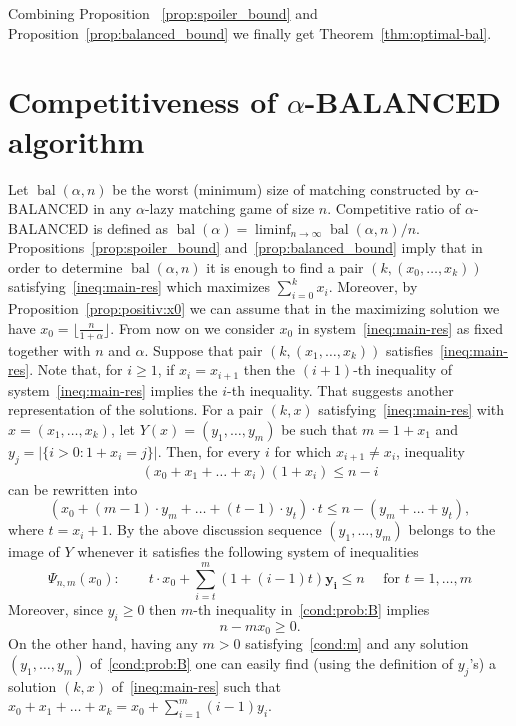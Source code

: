 \documentclass[12pt]{amsart}
\renewcommand{\leq}{\leqslant}
\renewcommand{\geq}{\geqslant}
\theoremstyle{definition}
\newcommand{\Alg}[0]{\textsf{BALANCED}\xspace}
\DeclareMathOperator{\bal}{bal}
\newcommand{\eqB}{\Psi}
\newcommand{\vr}[1]{\mathbf{#1}}
\begin{document}
Combining Proposition ~\ref{prop:spoiler_bound} and Proposition~\ref{prop:balanced_bound} we finally get Theorem~\ref{thm:optimal-bal}.

\section{Competitiveness of $\alpha$-\Alg{} algorithm}
\label{sect:comp}


Let $\bal(\alpha,n)$ be the worst (minimum) size of matching constructed by $\alpha$-\Alg{} in any $\alpha$-lazy matching game of size $n$.
Competitive ratio of $\alpha$-\Alg{} is defined as $\bal(\alpha) = \liminf_{n\to\infty} \bal(\alpha,n)/n$.
Propositions~\ref{prop:spoiler_bound} and~\ref{prop:balanced_bound} imply that in order to determine $\bal(\alpha,n)$ it is enough to find a pair $(k,(x_0,\ldots, x_k))$ satisfying~\eqref{ineq:main-res} which maximizes $\sum_{i=0}^k x_i$.
Moreover, by Proposition~\ref{prop:positiv:x0} we can assume that in the maximizing solution we have $x_0= \lfloor \frac{n}{1+\alpha} \rfloor$.
From now on we consider $x_0$ in system~\eqref{ineq:main-res} as fixed together with $n$ and $\alpha$.
Suppose that pair $(k,(x_1,\ldots, x_k))$ satisfies~\eqref{ineq:main-res}.
Note that, for $i\geq 1$, if $x_i= x_{i+1}$ then the $(i+1)$-th inequality of system~\eqref{ineq:main-res} implies the $i$-th inequality.
That suggests another representation of the solutions.
For a pair $(k,x)$ satisfying~\eqref{ineq:main-res} with $x=(x_1, \ldots, x_k)$, let $Y(x)=(y_1, \ldots, y_m)$ be such that $m=1+x_1$ and $y_j= |\{i>0: 1+x_i= j\}|$.
Then, for every $i$ for which $x_{i+1}\neq x_i$, inequality 
\[
   (x_0+x_1+\ldots+x_i)(1+x_i) \leq n-i
\]
can be rewritten into 
\[
	(x_0 + (m-1) \cdot y_m + \ldots +(t-1)\cdot y_t) \cdot t \leq n- (y_m + \ldots + y_t),
\]
where $t=x_i+1$.
By the above discussion sequence $(y_1, \ldots, y_m)$ belongs to the image of $Y$ whenever it satisfies the following system of inequalities 
\begin{equation}\label{cond:prob:B}
   \eqB_{n,m}(x_0):\qquad t\cdot x_0 + \sum_{i=t}^m (1+(i-1)t)\vr{y_i} \leq n \quad \text{ for $t=1, \ldots,m$}
\end{equation}
Moreover, since $y_i\geq0$ then $m$-th inequality in~\eqref{cond:prob:B} implies
\begin{equation}\label{cond:m}
 n-mx_0\geq0.
\end{equation}
On the other hand, having any $m>0$ satisfying~\eqref{cond:m} and any solution $(y_1,\ldots,y_m)$ of~\eqref{cond:prob:B} one can easily
find (using the definition of $y_j$'s) a solution $(k,x)$ of~\eqref{ineq:main-res} such that $x_0+x_1+\ldots + x_k = x_0 + \sum_{i=1}^m(i-1)y_i$.
\end{document}
